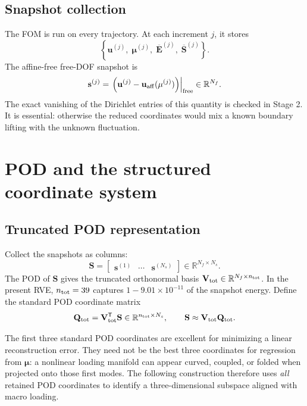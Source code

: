 \documentclass[11pt,a4paper]{article}
\newcommand{\R}{\mathbb{R}}
\newcommand{\transpose}{^{\mathsf T}}
\newcommand{\vect}[1]{\mathbf{#1}}
\newcommand{\mat}[1]{\mathbf{#1}}
\begin{document}
\subsection{Snapshot collection}

The FOM is run on every trajectory.  At each increment \(j\), it stores
\begin{equation}
  \left\{\vect u^{(j)},\;\vect\mu^{(j)},\;
  \overline{\mat E}^{(j)},\;\overline{\mat S}^{(j)}\right\}.
  \label{eq:snapshot-tuple}
\end{equation}
The affine-free free-DOF snapshot is
\begin{equation}
  \vect s^{(j)}
  = \left.\left(\vect u^{(j)}-\vect u_{\rm aff}(\vect\mu^{(j)})\right)
    \right|_{\rm free}
  \in\R^{N_f}.
  \label{eq:fluctuation-snapshot}
\end{equation}
The exact vanishing of the Dirichlet entries of this quantity is checked in
Stage 2.  It is essential: otherwise the reduced coordinates would mix a
known boundary lifting with the unknown fluctuation.

\section{POD and the structured coordinate system}
\label{sec:coordinates}

\subsection{Truncated POD representation}

Collect the snapshots as columns:
\begin{equation}
  \mat S
  =\begin{bmatrix}
    \vect s^{(1)} & \cdots & \vect s^{(N_s)}
  \end{bmatrix}
  \in\R^{N_f\times N_s}.
  \label{eq:snapshot-matrix}
\end{equation}
The POD of \(\mat S\) gives the truncated orthonormal basis
\(\mat V_{\rm tot}\in\R^{N_f\times n_{\rm tot}}\).  In the present RVE,
\(n_{\rm tot}=39\) captures \(1-9.01\times10^{-11}\) of the snapshot
energy.  Define the standard POD coordinate matrix
\begin{equation}
  \mat Q_{\rm tot}
  = \mat V_{\rm tot}\transpose\mat S
  \in\R^{n_{\rm tot}\times N_s},
  \qquad
  \mat S\approx\mat V_{\rm tot}\mat Q_{\rm tot}.
  \label{eq:standard-pod-coordinates}
\end{equation}

The first three standard POD coordinates are excellent for minimizing a
linear reconstruction error.  They need not be the best three coordinates
for regression from \(\vect\mu\): a nonlinear loading manifold can appear
curved, coupled, or folded when projected onto those first modes.  The
following construction therefore uses \emph{all} retained POD coordinates to
identify a three-dimensional subspace aligned with macro loading.
\end{document}
